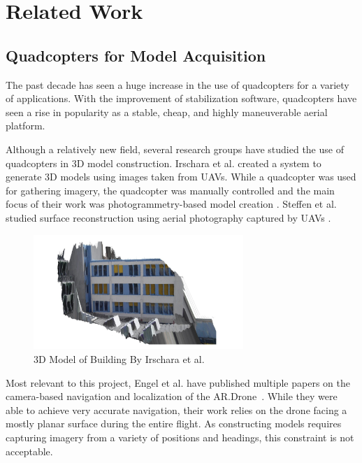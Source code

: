 
\chapter{Related Work\label{ch:pastwork}}

\section{Quadcopters for Model Acquisition}

	The past decade has seen a huge increase in the use of quadcopters for a variety of applications. With the improvement of stabilization software, quadcopters have seen a rise in popularity as a stable, cheap, and highly maneuverable aerial platform. 

	Although a relatively new field, several research groups have studied the use of quadcopters in 3D model construction. Irschara et al. created a system to generate 3D models using images taken from UAVs. While a quadcopter was used for gathering imagery, the quadcopter was manually controlled and the main focus of their work was photogrammetry-based model creation \cite{Irschara}. Steffen et al. studied surface reconstruction using aerial photography captured by UAVs \cite{Steffen}.

	 \begin{figure}[ht]
            \centering
            \includegraphics[width=300px]{../images/Irschara.png}
            \caption{3D Model of Building By Irschara et al.~\cite{Irschara}}\label{fig:Irschara}
    \end{figure}

	Most relevant to this project, Engel et al. have published multiple papers on the camera-based navigation and localization of the AR.Drone~\cite{Engel, Engel2}. While they were able to achieve very accurate navigation, their work relies on the drone facing a mostly planar surface during the entire flight. As constructing models requires capturing imagery from a variety of positions and headings, this constraint is not acceptable.

